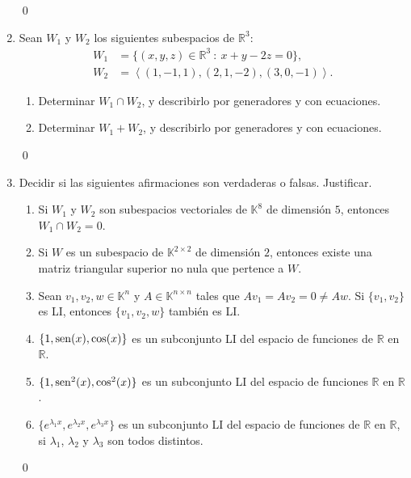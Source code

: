 \begin{enumerate}[resume, topsep=6pt, itemsep=.4cm]
    \rta 

    \qed     
    
    \item Sean $W_1$ y $W_2$ los siguientes subespacios de $\mathbb{R}^3$:
        \begin{align*}
        W_1 &= \{ (x,y,z)\in\mathbb{R}^3\ : \ x+y-2z=0\},  \\
        W_2 &= {\left\langle(1,-1,1),(2,1,-2),(3,0,-1)\right\rangle}.
        \end{align*}
        \begin{enumerate}
            \item  Determinar $W_1 \cap W_2$, y describirlo por generadores y con ecuaciones.
            \item  Determinar $W_1+W_2$, y describirlo por generadores y con ecuaciones.
        \end{enumerate}
    
    
    \rta 

    \qed     
        
    \item\label{verdadero o falso} Decidir si las siguientes afirmaciones son verdaderas o falsas. Justificar.
    
    \begin{enumerate}
    \item Si $W_1$ y $W_2$ son subespacios vectoriales de $\mathbb{K}^8$ de dimensión $5$, entonces $W_1\cap W_2=0$.
    \item Si $W$ es un subespacio de $\mathbb{K}^{2\times2}$ de dimensión $2$, entonces existe una matriz triangular superior no nula que pertence a $W$.
    \item Sean $v_1, v_2, w\in \mathbb{K}^{n}$ y $A\in\mathbb{K}^{n\times n}$ tales que $Av_1=Av_2=0\neq Aw$. Si $\{v_1, v_2\}$ es LI, entonces $\{v_1,v_2,w\}$ también es LI.
    \item\label{cos}  $\{1,{\rm sen}(x),\cos(x)\}$ es un subconjunto LI del espacio de funciones de $\mathbb{R}$ en $\mathbb{R}$.
    \item\label{cos2}  $\{1,{\rm sen}^2(x),\cos^2(x)\}$ es un subconjunto LI del espacio de funciones $\mathbb{R}$ en $\mathbb{R}$.
    \item\label{exponencial}  $\{e^{\lambda_1x},e^{\lambda_2x},e^{\lambda_3x}\}$ es un subconjunto LI del espacio de funciones de
    $\mathbb{R}$ en $\mathbb{R}$, si $\lambda_1$, $\lambda_2$ y $\lambda_3$ son todos distintos.
    \end{enumerate}
    
    
    \rta 

    \qed     
    
    
    
    
    \end{enumerate}
    
    